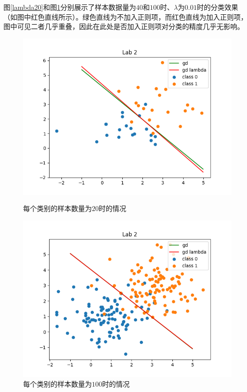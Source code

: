 图\ref{lambda20}和图\ref{lambda100}分别展示了样本数据量为$40$和$100$时、$\lambda$为$0.01$时的分类效果（如图中红色直线所示）。绿色直线为不加入正则项，而红色直线为加入正则项，图中可见二者几乎重叠，因此在此处是否加入正则项对分类的精度几乎无影响。

\begin{figure}[htbp]
    \begin{minipage}[t]{0.5\linewidth}
        \centering
        \includegraphics[width=\textwidth]{figures/Figure_4.png}
        \caption{每个类别的样本数量为$20$时的情况}
        \label{lambda20}
    \end{minipage}
    \begin{minipage}[t]{0.5\linewidth}
        \centering
        \includegraphics[width=\textwidth]{figures/Figure_5.png}
        \caption{每个类别的样本数量为$100$时的情况}
        \label{lambda100}
    \end{minipage}
\end{figure}


